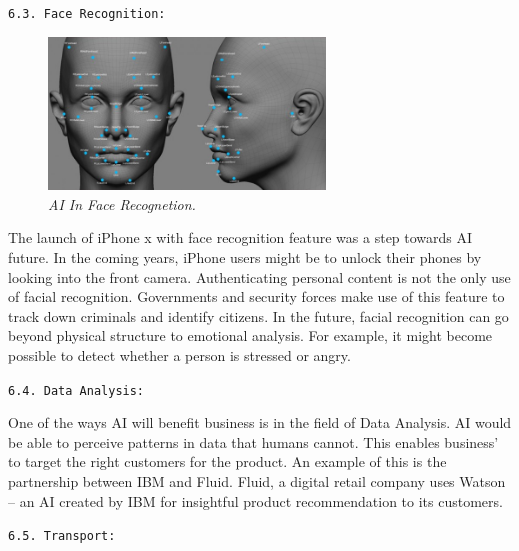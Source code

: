 \documentclass{article}
\begin{document}
\begin{large}
\texttt{6.3. Face Recognition:}
\end{large}

\begin{figure}
\centering
\includegraphics[width=2.9in]{Face Reg}

\caption{\textit{AI In Face Recognetion.}}
\end{figure}

The launch of iPhone x with face recognition feature was a step towards AI future. In the coming years,
 iPhone users might be to unlock their phones by looking into the front camera. Authenticating personal content is not the only use of facial recognition. Governments and security forces make use of this feature to track down criminals and identify citizens. In the future, facial recognition can go beyond physical structure to emotional analysis. For example, it might become possible to detect whether a person is stressed or angry.\\

\begin{large}
\texttt{6.4. Data Analysis:}
\end{large}
One of the ways AI will benefit business is in the field of Data Analysis. AI would be able to perceive patterns in data that humans cannot. This enables business’ to target the right customers for the product. An example of this is the partnership between IBM and Fluid. Fluid, a digital retail company uses Watson – an AI created by IBM for insightful product recommendation to its customers.\\

\begin{large}
\texttt{6.5. Transport:}
\end{large}
\end{document}
